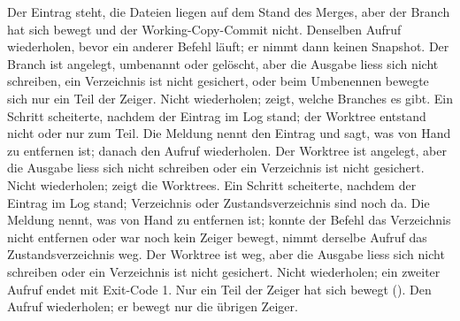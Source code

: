 \stopxrow
\startxrow
\startxcell[width=0.26\textwidth]  \stopxcell
\startxcell[width=0.35\textwidth] Der Eintrag steht, die Dateien liegen auf dem Stand des Merges,
aber der Branch hat sich bewegt und der Working-Copy-Commit nicht. \stopxcell
\startxcell Denselben Aufruf wiederholen, bevor ein anderer Befehl läuft;
er nimmt dann keinen Snapshot. \stopxcell
\stopxrow
\startxrow
\startxcell[width=0.26\textwidth]  \stopxcell
\startxcell[width=0.35\textwidth] Der Branch ist angelegt, umbenannt oder gelöscht,
aber die Ausgabe liess sich nicht schreiben, ein Verzeichnis ist nicht gesichert,
oder beim Umbenennen bewegte sich nur ein Teil der Zeiger. \stopxcell
\startxcell Nicht wiederholen;  zeigt, welche Branches es gibt. \stopxcell
\stopxrow
\startxrow
\startxcell[width=0.26\textwidth] \dontleavehmode\hbox{} \stopxcell
\startxcell[width=0.35\textwidth] Ein Schritt scheiterte, nachdem der Eintrag im Log stand;
der Worktree entstand nicht oder nur zum Teil. \stopxcell
\startxcell Die Meldung nennt den Eintrag und sagt, was von Hand zu entfernen ist;
danach den Aufruf wiederholen. \stopxcell
\stopxrow
\startxrow
\startxcell[width=0.26\textwidth] \dontleavehmode\hbox{} \stopxcell
\startxcell[width=0.35\textwidth] Der Worktree ist angelegt,
aber die Ausgabe liess sich nicht schreiben oder ein Verzeichnis ist nicht gesichert. \stopxcell
\startxcell Nicht wiederholen;  zeigt die Worktrees. \stopxcell
\stopxrow
\startxrow
\startxcell[width=0.26\textwidth] \dontleavehmode\hbox{} \stopxcell
\startxcell[width=0.35\textwidth] Ein Schritt scheiterte, nachdem der Eintrag im Log stand;
Verzeichnis oder Zustandsverzeichnis sind noch da. \stopxcell
\startxcell Die Meldung nennt, was von Hand zu entfernen ist; konnte der Befehl das Verzeichnis
nicht entfernen oder war noch kein Zeiger bewegt,
nimmt derselbe Aufruf das Zustandsverzeichnis weg. \stopxcell
\stopxrow
\startxrow
\startxcell[width=0.26\textwidth] \dontleavehmode\hbox{} \stopxcell
\startxcell[width=0.35\textwidth] Der Worktree ist weg,
aber die Ausgabe liess sich nicht schreiben oder ein Verzeichnis ist nicht gesichert. \stopxcell
\startxcell Nicht wiederholen; ein zweiter Aufruf endet mit Exit-Code 1. \stopxcell
\stopxrow
\startxrow
\startxcell[width=0.26\textwidth] \dontleavehmode\hbox{} \stopxcell
\startxcell[width=0.35\textwidth] Nur ein Teil der Zeiger hat sich bewegt
(). \stopxcell
\startxcell Den Aufruf wiederholen; er bewegt nur die übrigen Zeiger. \stopxcell
